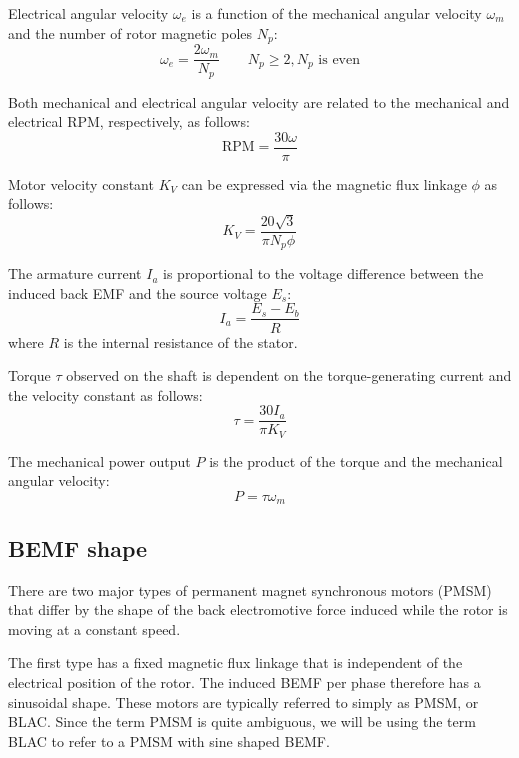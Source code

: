 \documentclass{zubaxdoc}
\begin{document}
Electrical angular velocity $\omega_e$ is a function of the mechanical angular velocity $\omega_m$
and the number of rotor magnetic poles $N_p$:
\begin{equation}
\omega_e = \frac{2 \omega_m}{N_p}\qquad
N_p \geq 2, N_p\text{\ is even}
\end{equation}

Both mechanical and electrical angular velocity are related to the mechanical and electrical RPM,
respectively, as follows:
\begin{equation}
\text{RPM} = \frac{30 \omega }{\pi }
\end{equation}

Motor velocity constant $K_V$ can be expressed via the magnetic flux linkage $\phi$ as follows:
\begin{equation}
K_V = \frac{20 \sqrt{3}}{\pi  N_p \phi }
\end{equation}

The armature current $I_a$ is proportional to the voltage difference between the induced back EMF and
the source voltage $E_s$:
\begin{equation}
I_a = \frac{E_s - E_b}{R}
\end{equation}
where $R$ is the internal resistance of the stator.

Torque $\tau$ observed on the shaft is dependent on the torque-generating current and the velocity constant
as follows:
\begin{equation}
\tau = \frac{30 I_a}{\pi K_V}
\end{equation}

The mechanical power output $P$ is the product of the torque and the mechanical angular velocity:
\begin{equation}
P = \tau \omega_m
\end{equation}

\subsection{BEMF shape}

There are two major types of permanent magnet synchronous motors (PMSM) that differ by the shape of the back
electromotive force induced while the rotor is moving at a constant speed.

The first type has a fixed magnetic flux linkage that is independent of the electrical position of the rotor.
The induced BEMF per phase therefore has a sinusoidal shape.
These motors are typically referred to simply as PMSM, or BLAC.
Since the term PMSM is quite ambiguous, we will be using the term BLAC to refer to a PMSM with sine shaped BEMF.
\end{document}
